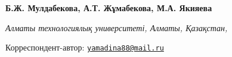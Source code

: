 
\begin{articleheader}

{\bfseries
Б.Ж. Мулдабекова,
А.Т. Жұмабекова,
М.А. Якияева\textsuperscript{\envelope }
}
\end{articleheader}

\begin{affiliation}
\emph{Алматы технологиялық университеті, Алматы, Қазақстан,}

\raggedright \textsuperscript{\envelope }Корреспондент-автор:
\href{mailto:yamadina88@mail.ru}{\nolinkurl{yamadina88@mail.ru}}
\end{affiliation}

